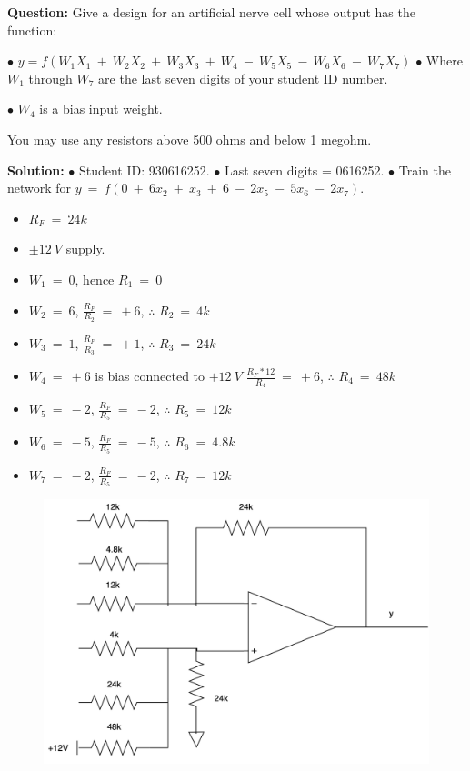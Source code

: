 \documentclass[12pt]{article}
\begin{document}
\textbf{Question:} Give a design for an artificial nerve cell whose output has the function:\BlankLine

$\bullet$ $y = f ( W_1X_1 \ + \ W_2X_2 \ + \ W_3X_3 \ + \ W_4 \ - \ W_5X_5 \ - \ W_6X_6 \ - \ W_7X_7 )$
\BlankLine
$\bullet$ Where $W_1$ through $W_7$ are the last seven digits of your student ID number.\BlankLine

$\bullet$ $W_4$ is a bias input weight.\BlankLine

You may use any resistors above 500 ohms and below 1 megohm.
\BlankLine
\BlankLine

\textbf{Solution:} 
\BlankLine
$\bullet$ Student ID: 930616252.\BlankLine
$\bullet$ Last seven digits = 0616252. \BlankLine
$\bullet$ Train the network for $y \ = \ f(0 \ + \ 6x_2 \ + \ x_3 \ + \ 6 \ - \ 2x_5 \ - \ 5x_6 \ - \ 2x_7)$. \BlankLine

\begin{itemize}
	\item $R_F \ = \ 24k$
	\item $\pm{12\ V}$ supply.
	\item $W_1 \ = \ 0$, hence $R_1 \ = \ 0$
	\item $W_2 \ = \ 6$, $\frac{R_F}{R_2} \ = \ +6$, $\therefore$ $R_2 \ = \ 4k$  
	\item $W_3 \ = \ 1$, $\frac{R_F}{R_3} \ = \ +1$, $\therefore$ $R_3 \ = \ 24k$
	\item $W_4 \ = \ +6$ is bias connected to $+12\  V$ $\frac{R_F * 12}{R_4} \ = \ +6$, $\therefore$ $R_4 \ = \ 48k$
	\item $W_5 \ = \ -2$, $\frac{R_F}{R_5} \ = \ -2$, $\therefore$ $R_5 \ = \ 12k$
	\item $W_6 \ = \ -5$, $\frac{R_F}{R_5} \ = \ -5$, $\therefore$ $R_6 \ = \ 4.8k$
	\item $W_7 \ = \ -2$, $\frac{R_F}{R_5} \ = \ -2$, $\therefore$ $R_7 \ = \ 12k$
	
\end{itemize}

\begin{figure}[H]
	\includegraphics[width=15cm]{circuit.png}
\end{figure}
\end{document}
